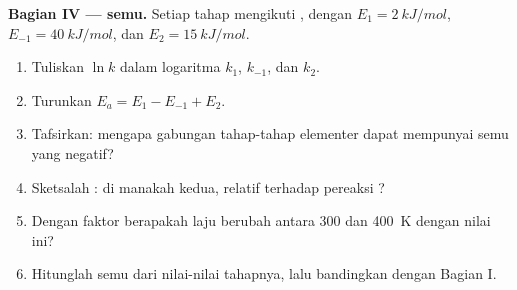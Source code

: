 \begin{problem}
\medskip
\noindent\textbf{Bagian IV ---  semu.}
Setiap tahap mengikuti , dengan  $E_1 =
\qty{2}{kJ/mol}$, $E_{-1} = \qty{40}{kJ/mol}$, dan $E_2 =
\qty{15}{kJ/mol}$.
\begin{enumerate}[resume]
  \item Tuliskan $\ln k$ dalam logaritma $k_1$, $k_{-1}$, dan $k_2$.
  \item Turunkan $E_a = E_1 - E_{-1} + E_2$.
  \item Tafsirkan: mengapa gabungan tahap-tahap elementer dapat
        mempunyai  semu yang negatif?
  \item Sketsalah : di manakah  kedua,
        relatif terhadap pereaksi ?
  \item Dengan faktor berapakah laju berubah antara 300 dan \qty{400}{K}
        dengan nilai ini?
  \item Hitunglah  semu dari nilai-nilai tahapnya, lalu
        bandingkan dengan Bagian I.
\end{enumerate}
\end{problem}
